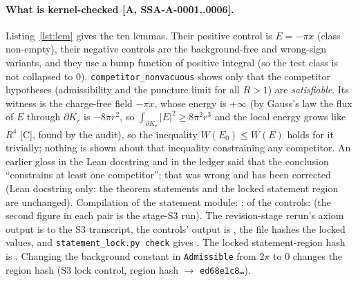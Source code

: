 \documentclass[10pt]{article}
\newcommand{\tier}[1]{\textsf{[#1]}}
\newcommand{\lean}[1]{\texttt{#1}}
\newcommand{\hash}[1]{\texttt{\expandafter\seqsplit\expandafter{#1}}}
\begin{document}
\paragraph{What is kernel-checked \tier{A, SSA-A-0001..0006}.} Listing~\ref{lst:lem} gives the ten lemmas. Their positive control is $E=-\pi x$ (class non-empty), their negative controls are the background-free and wrong-sign variants, and they use a bump function of positive integral (so the test class is not collapsed to $0$). \lean{competitor\_nonvacuous} shows only that the competitor hypotheses (admissibility and the puncture limit for all $R>1$) are \emph{satisfiable}. Its witness is the charge-free field $-\pi x$, whose energy is $+\infty$ (by Gauss's law the flux of $E$ through $\partial K_r$ is $-8\pi r^2$, so $\int_{\partial K_r}|E|^2\ge8\pi^2r^3$ and the local energy grows like $R^4$ \tier{C}, found by the audit), so the inequality $W(E_0)\le W(E)$ holds for it trivially; nothing is shown about that inequality constraining any competitor. An earlier gloss in the Lean docstring and in the ledger said that the conclusion ``constrains at least one competitor''; that was wrong and has been corrected (Lean docstring only: the theorem statements and the locked statement region are unchanged).
Compilation of the statement module: \SSACompileMain; of the controls: \SSACompileCtl{} (the second figure in each pair is the stage-S3 run). The revision-stage rerun's axiom output is \SSAAxiomsSame{} to the S3 transcript, the controls' output is \SSACtlSame, the file hashes \SSAShaMatch{} the locked values, and \texttt{statement\_lock.py check} gives \texttt{\SSALockCheck}.
The locked statement-region hash is \hash{\SSAShaRegion}. Changing the background constant in \lean{Admissible} from $2\pi$ to $0$ changes the region hash (S3 lock control, region hash $\to$ \texttt{ed68e1c8\ldots}).




\end{document}
